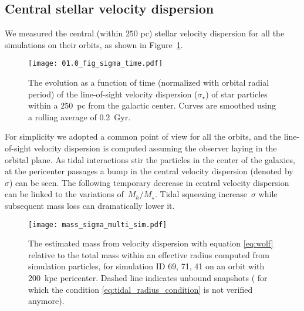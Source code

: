 \subsection{Central stellar velocity dispersion}
We measured the central (within $250$ pc) stellar velocity dispersion for all the simulations on their orbits, as shown in Figure~\ref{fig:sigma}.
\begin{figure}[ht]
\centering
\texttt{[image: 01.0\_fig\_sigma\_time.pdf]}
\caption{The evolution as a function of time (normalized with orbital radial period) of the
line-of-sight velocity dispersion ($\sigma_\star$) of star particles within a $250$~pc from the galactic center.
Curves are smoothed using a rolling average of 0.2~Gyr.
}
\label{fig:sigma}
\end{figure}
For simplicity we adopted a common point of view for all the orbits, and the line-of-sight velocity dispersion is computed assuming the observer laying in the orbital plane.
As tidal interactions stir the particles in the center of the galaxies, at the pericenter passages a bump in the central velocity dispersion (denoted by~$\sigma$) can be seen.
The following temporary decrease in central velocity dispersion can be linked to the variations of~$M_h/M_\star$.
Tidal squeezing increase~$\sigma$ while subsequent mass loss can dramatically lower it.

\begin{figure}[ht]
\centering
\texttt{[image: mass\_sigma\_multi\_sim.pdf]}
\caption{The estimated mass from velocity dispersion with equation \eqref{eq:wolf} relative to the total mass within an effective radius computed from simulation particles,
for simulation ID 69, 71, 41 on an orbit with 200~kpc pericenter.
Dashed line indicates unbound snapshots (\ie{} for which the condition \eqref{eq:tidal_radius_condition} is not verified anymore).
}
\label{fig:wolf}
\end{figure}

